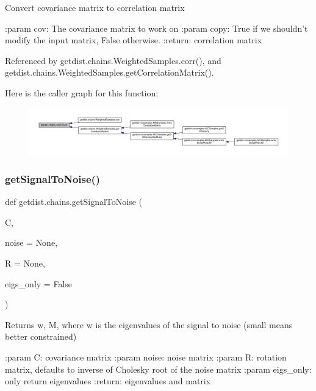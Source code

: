 \begin{DoxyVerb}Convert covariance matrix to correlation matrix

:param cov: The covariance matrix to work on
:param copy: True if we shouldn't modify the input matrix, False otherwise.
:return: correlation matrix
\end{DoxyVerb}
 

Referenced by getdist.\+chains.\+Weighted\+Samples.\+corr(), and getdist.\+chains.\+Weighted\+Samples.\+get\+Correlation\+Matrix().

Here is the caller graph for this function\+:
\nopagebreak
\begin{figure}[H]
\begin{center}
\leavevmode
\includegraphics[width=350pt]{namespacegetdist_1_1chains_ab06bc0bb109554727a57f915baa61c36_icgraph}
\end{center}
\end{figure}
\mbox{\label{namespacegetdist_1_1chains_a5e06cfdb8cb9fcc1c441388e98b667a1}} 
\subsubsection{\texorpdfstring{get\+Signal\+To\+Noise()}{getSignalToNoise()}}
{\footnotesize\ttfamily def getdist.\+chains.\+get\+Signal\+To\+Noise (\begin{DoxyParamCaption}\item[{}]{C,  }\item[{}]{noise = {\ttfamily None},  }\item[{}]{R = {\ttfamily None},  }\item[{}]{eigs\+\_\+only = {\ttfamily False} }\end{DoxyParamCaption})}

\begin{DoxyVerb}Returns w, M, where w is the eigenvalues of the signal to noise (small means better constrained)

:param C: covariance matrix
:param noise: noise matrix
:param R: rotation matrix, defaults to inverse of Cholesky root of the noise matrix
:param eigs_only: only return eigenvalues
:return: eigenvalues and matrix
\end{DoxyVerb}
 \mbox{\label{namespacegetdist_1_1chains_a1ae5a71875f23ffd319d9920c10b8874}} 
